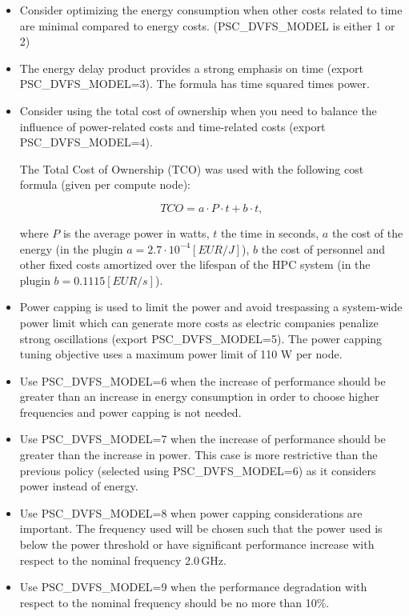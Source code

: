 \begin{itemize}

\item  Consider optimizing the energy consumption when other costs related to time are minimal compared to energy costs. (PSC\_DVFS\_MODEL is either 1 or 2)

\item The energy delay product provides a strong emphasis on time (export PSC\_DVFS\_MODEL=3). The formula has time squared times power.

\item Consider using the total cost of ownership when you need to balance the influence of power-related costs and time-related costs (export PSC\_DVFS\_MODEL=4).

The Total Cost of Ownership (TCO) was used with the following cost formula (given per compute node):

\begin{equation}\label{eq: TCO}
		  TCO = a \cdot P \cdot t + b \cdot t,
\end{equation}

where $P$ is the average power in watts, $t$ the time in seconds, $a$ the cost of the energy  (in the plugin $ a = 2.7 \cdot 10^{-4} [EUR/J]$), $b$ the cost of personnel and other fixed costs amortized over the lifespan of the HPC system (in the plugin $ b = 0.1115 [EUR/s] $).

\item Power capping is used to limit the power and avoid trespassing a system-wide power limit which can generate more costs as electric companies penalize strong oscillations (export PSC\_DVFS\_MODEL=5). The power capping tuning objective uses a maximum power limit of 110 W per node.\\

\item Use PSC\_DVFS\_MODEL=6 when the increase of performance should be greater than an increase in energy  consumption in order to choose higher frequencies and power capping is not needed.

\item Use PSC\_DVFS\_MODEL=7 when the increase of performance should be greater than the increase in power. This case is more restrictive than the previous policy (selected using PSC\_DVFS\_MODEL=6) as it considers power instead of energy.

\item Use PSC\_DVFS\_MODEL=8 when power capping considerations are important. The frequency used will be chosen such that the power used is below the power threshold or have significant performance increase with respect to the nominal frequency 2.0\,GHz.

\item Use PSC\_DVFS\_MODEL=9 when the performance degradation with respect to the nominal frequency should be no more than 10\%.

\end{itemize}
	
